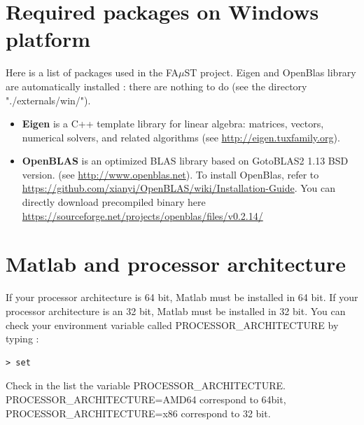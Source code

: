 \section{Required packages on Windows platform}\label{sec:WinRequiredPackages}
Here is a list of packages used in the FA$\mu$ST project. Eigen and OpenBlas library are automatically installed : there are nothing to do (see the directory "./externals/win/").
\begin{itemize}
\item \textbf{Eigen} is a C++ template library for linear algebra: matrices, vectors, numerical solvers, and related algorithms (see \url{http://eigen.tuxfamily.org}).
\item \textbf{OpenBLAS} is an optimized BLAS library based on GotoBLAS2 1.13 BSD version. (see \url{http://www.openblas.net}). To install OpenBlas, refer to \url{https://github.com/xianyi/OpenBLAS/wiki/Installation-Guide}. You can directly download precompiled binary here \url{https://sourceforge.net/projects/openblas/files/v0.2.14/}
\end{itemize}

\section{Matlab and processor architecture}\label{sec:ANNEXEMatlabArch}
If your processor architecture is 64 bit, Matlab must be installed in 64 bit. If your processor architecture is an 32 bit, Matlab must be installed in 32 bit. You can check your environment variable called PROCESSOR\_ARCHITECTURE by typing :
\lstset{style=customBash}
\begin{lstlisting}
> set
\end{lstlisting}
Check in the list the variable PROCESSOR\_ARCHITECTURE. \\
PROCESSOR\_ARCHITECTURE=AMD64 correspond to 64bit, 
PROCESSOR\_ARCHITECTURE=x86 correspond to 32 bit.



